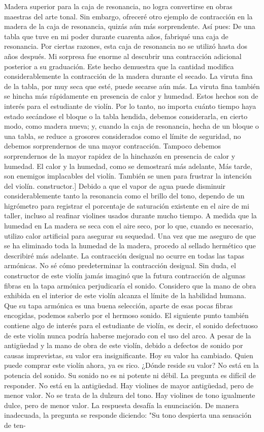Madera superior para la caja de resonancia, no logra convertirse en obras maestras del arte tonal. Sin embargo, ofreceré otro ejemplo de contracción en la madera de la caja de resonancia, quizás aún más sorprendente. Así pues: De una tabla que tuve en mi poder durante cuarenta años, fabriqué una caja de resonancia. Por ciertas razones, esta caja de resonancia no se utilizó hasta dos años después. Mi sorpresa fue enorme al descubrir una contracción adicional posterior a su graduación. Este hecho demuestra que la cantidad modifica considerablemente la contracción de la madera durante el secado. La viruta fina de la tabla, por muy seca que esté, puede secarse aún más. La viruta fina también se hincha más rápidamente en presencia de calor y humedad. Estos hechos son de interés para el estudiante de violín. Por lo tanto, no importa cuánto tiempo haya estado secándose el bloque o la tabla hendida, debemos considerarla, en cierto modo, como madera nueva; y, cuando la caja de resonancia, hecha de un bloque o una tabla, se reduce a grosores considerados como el límite de seguridad, no debemos sorprendernos de una mayor contracción. Tampoco debemos sorprendernos de la mayor rapidez de la hinchazón en presencia de calor y humedad. El calor y la humedad, como se demostrará más adelante,
Más tarde, son enemigos implacables del violín. También se unen para frustrar la intención del violín.
constructor.]
Debido a que el vapor de agua puede disminuir considerablemente tanto la resonancia como el brillo del tono, dependo de un higrómetro para registrar el porcentaje de saturación existente en el aire de mi taller, incluso al reafinar violines usados durante mucho tiempo. A medida que la humedad en
La madera se seca con el aire seco, por lo que, cuando es necesario, utilizo calor artificial para asegurar su sequedad. Una vez que me aseguro de que se ha eliminado toda la humedad de la madera, procedo al sellado hermético que describiré más adelante.
La contracción desigual no ocurre en todas las tapas armónicas. No sé cómo predeterminar la contracción desigual. Sin duda, el constructor de este violín jamás imaginó que la futura contracción de algunas fibras en la tapa armónica perjudicaría el sonido. Considero que la mano de obra exhibida en el interior de este violín alcanza el límite de la habilidad humana. Que su tapa armónica es una buena selección, aparte de esas pocas fibras encogidas, podemos saberlo por el hermoso sonido. El siguiente punto también contiene algo de interés para el estudiante de violín, es decir, el sonido defectuoso de este violín nunca podría haberse mejorado con el uso del arco. A pesar de la antigüedad y la mano de obra de este violín, debido a defectos de sonido por causas imprevistas, su valor era insignificante. Hoy su valor ha cambiado. Quien puede comprar este violín ahora, ya es rico. ¿Dónde reside su valor? No está en la potencia del sonido. Su sonido no es ni potente ni débil. La pregunta es difícil de responder. No está en la antigüedad. Hay violines de mayor antigüedad, pero de menor valor. No se trata de la dulzura del tono. Hay violines de tono igualmente dulce, pero de menor valor. La respuesta desafía la enunciación. De manera inadecuada, la pregunta se responde diciendo: "Su tono despierta una sensación de ten-
